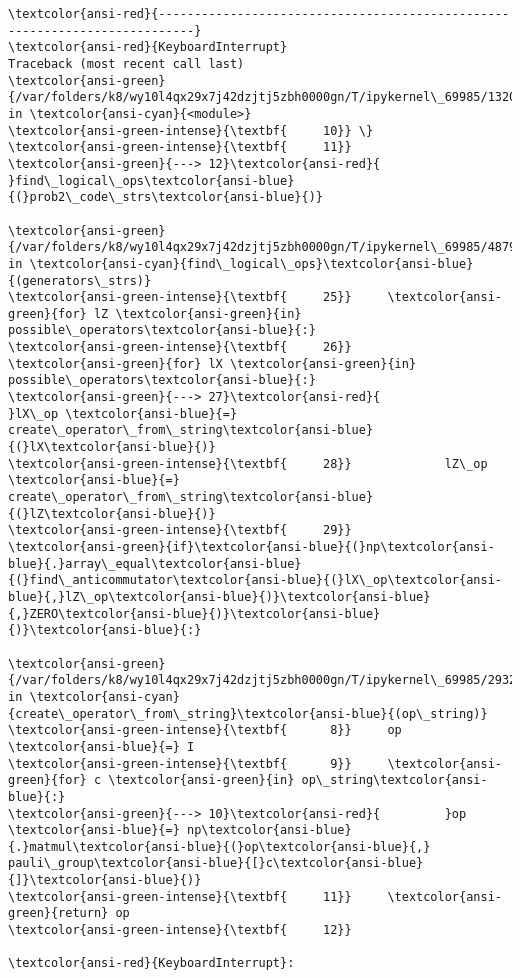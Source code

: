 \documentclass[11pt]{article}
\begin{document}
    \begin{Verbatim}[commandchars=\\\{\}, frame=single, framerule=2mm, rulecolor=\color{outerrorbackground}]
\textcolor{ansi-red}{---------------------------------------------------------------------------}
\textcolor{ansi-red}{KeyboardInterrupt}                         Traceback (most recent call last)
\textcolor{ansi-green}{/var/folders/k8/wy10l4qx29x7j42dzjtj5zbh0000gn/T/ipykernel\_69985/1320410860.py} in \textcolor{ansi-cyan}{<module>}
\textcolor{ansi-green-intense}{\textbf{     10}} \}
\textcolor{ansi-green-intense}{\textbf{     11}} 
\textcolor{ansi-green}{---> 12}\textcolor{ansi-red}{ }find\_logical\_ops\textcolor{ansi-blue}{(}prob2\_code\_strs\textcolor{ansi-blue}{)}

\textcolor{ansi-green}{/var/folders/k8/wy10l4qx29x7j42dzjtj5zbh0000gn/T/ipykernel\_69985/487974432.py} in \textcolor{ansi-cyan}{find\_logical\_ops}\textcolor{ansi-blue}{(generators\_strs)}
\textcolor{ansi-green-intense}{\textbf{     25}}     \textcolor{ansi-green}{for} lZ \textcolor{ansi-green}{in} possible\_operators\textcolor{ansi-blue}{:}
\textcolor{ansi-green-intense}{\textbf{     26}}         \textcolor{ansi-green}{for} lX \textcolor{ansi-green}{in} possible\_operators\textcolor{ansi-blue}{:}
\textcolor{ansi-green}{---> 27}\textcolor{ansi-red}{             }lX\_op \textcolor{ansi-blue}{=} create\_operator\_from\_string\textcolor{ansi-blue}{(}lX\textcolor{ansi-blue}{)}
\textcolor{ansi-green-intense}{\textbf{     28}}             lZ\_op \textcolor{ansi-blue}{=} create\_operator\_from\_string\textcolor{ansi-blue}{(}lZ\textcolor{ansi-blue}{)}
\textcolor{ansi-green-intense}{\textbf{     29}}             \textcolor{ansi-green}{if}\textcolor{ansi-blue}{(}np\textcolor{ansi-blue}{.}array\_equal\textcolor{ansi-blue}{(}find\_anticommutator\textcolor{ansi-blue}{(}lX\_op\textcolor{ansi-blue}{,}lZ\_op\textcolor{ansi-blue}{)}\textcolor{ansi-blue}{,}ZERO\textcolor{ansi-blue}{)}\textcolor{ansi-blue}{)}\textcolor{ansi-blue}{:}

\textcolor{ansi-green}{/var/folders/k8/wy10l4qx29x7j42dzjtj5zbh0000gn/T/ipykernel\_69985/2932398810.py} in \textcolor{ansi-cyan}{create\_operator\_from\_string}\textcolor{ansi-blue}{(op\_string)}
\textcolor{ansi-green-intense}{\textbf{      8}}     op \textcolor{ansi-blue}{=} I
\textcolor{ansi-green-intense}{\textbf{      9}}     \textcolor{ansi-green}{for} c \textcolor{ansi-green}{in} op\_string\textcolor{ansi-blue}{:}
\textcolor{ansi-green}{---> 10}\textcolor{ansi-red}{         }op \textcolor{ansi-blue}{=} np\textcolor{ansi-blue}{.}matmul\textcolor{ansi-blue}{(}op\textcolor{ansi-blue}{,} pauli\_group\textcolor{ansi-blue}{[}c\textcolor{ansi-blue}{]}\textcolor{ansi-blue}{)}
\textcolor{ansi-green-intense}{\textbf{     11}}     \textcolor{ansi-green}{return} op
\textcolor{ansi-green-intense}{\textbf{     12}} 

\textcolor{ansi-red}{KeyboardInterrupt}: 
    \end{Verbatim}
\end{document}
